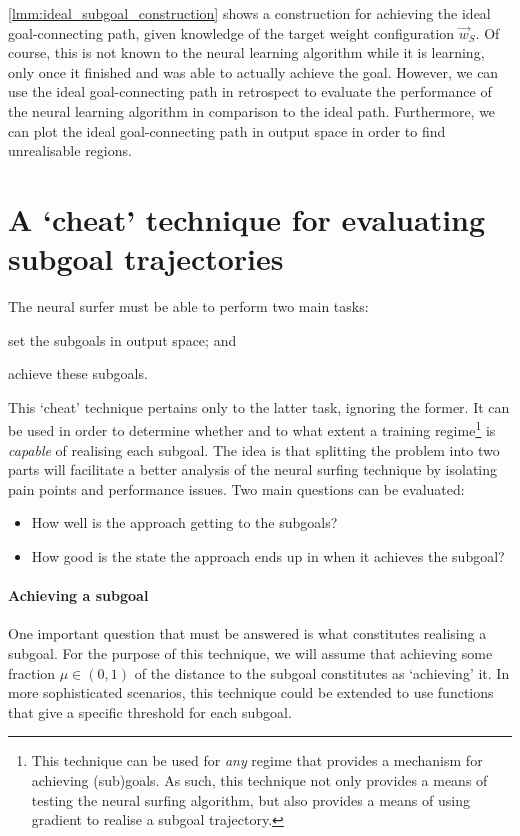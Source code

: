 \begin{remark}
    \ref{lmm:ideal_subgoal_construction} shows a construction for achieving the ideal goal-connecting path, given knowledge of the target weight configuration $\vec{w}_S$.
    Of course, this is not known to the neural learning algorithm while it is learning, only once it finished and was able to actually achieve the goal. 
    However, we can use the ideal goal-connecting path in retrospect to evaluate the performance of the neural learning algorithm in comparison to the ideal path.
    Furthermore, we can plot the ideal goal-connecting path in output space in order to find unrealisable regions.
\end{remark}

\section{A `cheat' technique for evaluating subgoal trajectories}
\label{sec:cheating_technique}
The neural surfer must be able to perform two main tasks: 
\begin{enumerate*}[label=(\roman*)]
    \item set the subgoals in output space; and
    \item achieve these subgoals.
\end{enumerate*}
This `cheat' technique pertains only to the latter task, ignoring the former.
It can be used in order to determine whether and to what extent a training regime\footnote{This technique can be used for \textit{any} regime that provides a mechanism for achieving (sub)goals. As such, this technique not only provides a means of testing the neural surfing algorithm, but also provides a means of using gradient to realise a subgoal trajectory.} is \textit{capable} of realising each subgoal.
The idea is that splitting the problem into two parts will facilitate a better analysis of the neural surfing technique by isolating pain points and performance issues.
Two main questions can be evaluated:
\begin{itemize}
    \item How well is the approach getting to the subgoals?
    \item How good is the state the approach ends up in when it achieves the subgoal?
\end{itemize}

\paragraph{Achieving a subgoal}
One important question that must be answered is what constitutes realising a subgoal. 
For the purpose of this technique, we will assume that achieving some fraction $\mu\in(0,1)$ of the distance to the subgoal constitutes as `achieving' it. 
In more sophisticated scenarios, this technique could be extended to use functions that give a specific threshold for each subgoal.

